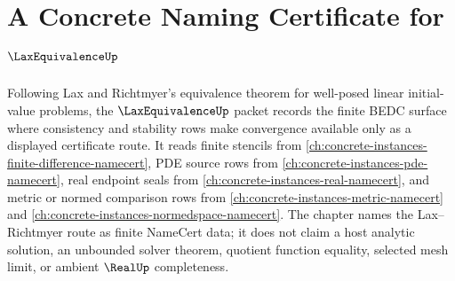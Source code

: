 \chapter{A Concrete Naming Certificate for $\LaxEquivalenceUp$}
\label{ch:concrete-instances-lax-equivalence-namecert}

Following Lax and Richtmyer's equivalence theorem for well-posed linear initial-value problems, the $\LaxEquivalenceUp$ packet records the finite BEDC surface where consistency and stability rows make convergence available only as a displayed certificate route. It reads finite stencils from \autoref{ch:concrete-instances-finite-difference-namecert}, PDE source rows from \autoref{ch:concrete-instances-pde-namecert}, real endpoint seals from \autoref{ch:concrete-instances-real-namecert}, and metric or normed comparison rows from \autoref{ch:concrete-instances-metric-namecert} and \autoref{ch:concrete-instances-normedspace-namecert}. The chapter names the Lax--Richtmyer route as finite NameCert data; it does not claim a host analytic solution, an unbounded solver theorem, quotient function equality, selected mesh limit, or ambient $\RealUp$ completeness.

